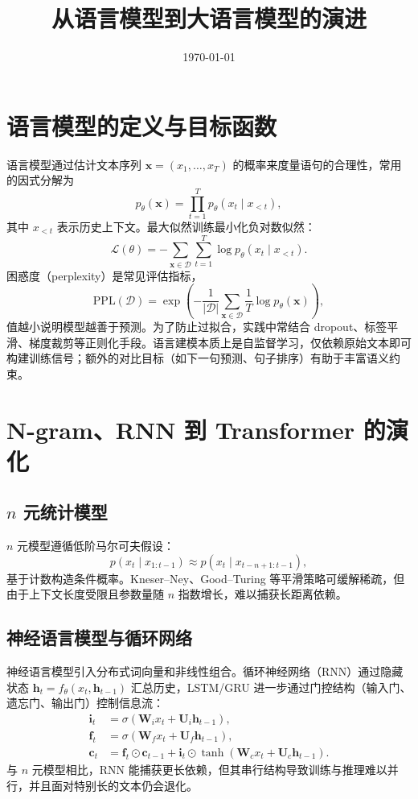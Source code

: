 \documentclass[UTF8,zihao=-4]{ctexart}
\title{从语言模型到大语言模型的演进}
\author{}
\date{\today}
\begin{document}
\maketitle

\section{语言模型的定义与目标函数}
语言模型通过估计文本序列 $\mathbf{x} = (x_1, \ldots, x_T)$ 的概率来度量语句的合理性，常用的因式分解为
\begin{equation}
  p_{\theta}(\mathbf{x}) = \prod_{t=1}^{T} p_{\theta}(x_t \mid x_{<t}),
\end{equation}
其中 $x_{<t}$ 表示历史上下文。最大似然训练最小化负对数似然：
\begin{equation}
  \mathcal{L}(\theta) = - \sum_{\mathbf{x} \in \mathcal{D}} \sum_{t=1}^{T} \log p_{\theta}(x_t \mid x_{<t}).
\end{equation}
困惑度（perplexity）是常见评估指标，
\begin{equation}
  \mathrm{PPL}(\mathcal{D}) = \exp\left( - \frac{1}{|\mathcal{D}|} \sum_{\mathbf{x} \in \mathcal{D}} \frac{1}{T} \log p_{\theta}(\mathbf{x}) \right),
\end{equation}
值越小说明模型越善于预测。为了防止过拟合，实践中常结合 dropout、标签平滑、梯度裁剪等正则化手段。语言建模本质上是自监督学习，仅依赖原始文本即可构建训练信号；额外的对比目标（如下一句预测、句子排序）有助于丰富语义约束。

\section{N-gram、RNN 到 Transformer 的演化}
\subsection{$n$ 元统计模型}
$n$ 元模型遵循低阶马尔可夫假设：
\begin{equation}
  p(x_t \mid x_{1:t-1}) \approx p(x_t \mid x_{t-n+1:t-1}),
\end{equation}
基于计数构造条件概率。Kneser--Ney、Good--Turing 等平滑策略可缓解稀疏，但由于上下文长度受限且参数量随 $n$ 指数增长，难以捕获长距离依赖。

\subsection{神经语言模型与循环网络}
神经语言模型引入分布式词向量和非线性组合。循环神经网络（RNN）通过隐藏状态 $\mathbf{h}_t = f_{\theta}(x_t, \mathbf{h}_{t-1})$ 汇总历史，LSTM/GRU 进一步通过门控结构（输入门、遗忘门、输出门）控制信息流：
\begin{align}
  \mathbf{i}_t &= \sigma(\mathbf{W}_i x_t + \mathbf{U}_i \mathbf{h}_{t-1}), \\
  \mathbf{f}_t &= \sigma(\mathbf{W}_f x_t + \mathbf{U}_f \mathbf{h}_{t-1}), \\
  \mathbf{c}_t &= \mathbf{f}_t \odot \mathbf{c}_{t-1} + \mathbf{i}_t \odot \tanh(\mathbf{W}_c x_t + \mathbf{U}_c \mathbf{h}_{t-1}).
\end{align}
与 $n$ 元模型相比，RNN 能捕获更长依赖，但其串行结构导致训练与推理难以并行，并且面对特别长的文本仍会退化。
\end{document}
